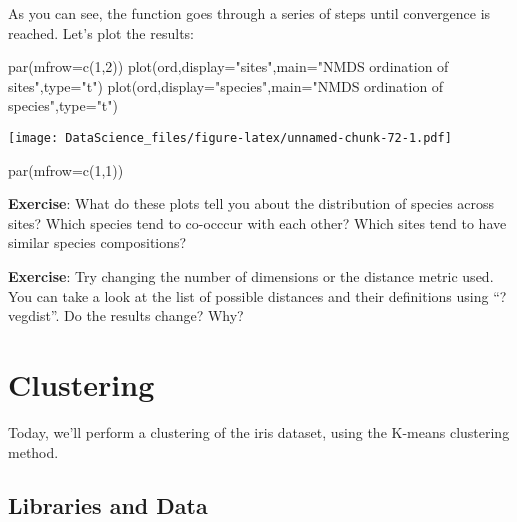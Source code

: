 \documentclass[
]{book}
\newenvironment{Shaded}{\begin{snugshade}}{\end{snugshade}}
\newcommand{\AttributeTok}[1]{\textcolor[rgb]{0.77,0.63,0.00}{#1}}
\newcommand{\DecValTok}[1]{\textcolor[rgb]{0.00,0.00,0.81}{#1}}
\newcommand{\FunctionTok}[1]{\textcolor[rgb]{0.00,0.00,0.00}{#1}}
\newcommand{\NormalTok}[1]{#1}
\newcommand{\StringTok}[1]{\textcolor[rgb]{0.31,0.60,0.02}{#1}}
\begin{document}
As you can see, the function goes through a series of steps until convergence is reached. Let's plot the results:

\begin{Shaded}
\begin{Highlighting}[]
\FunctionTok{par}\NormalTok{(}\AttributeTok{mfrow=}\FunctionTok{c}\NormalTok{(}\DecValTok{1}\NormalTok{,}\DecValTok{2}\NormalTok{))}
\FunctionTok{plot}\NormalTok{(ord,}\AttributeTok{display=}\StringTok{"sites"}\NormalTok{,}\AttributeTok{main=}\StringTok{"NMDS ordination of sites"}\NormalTok{,}\AttributeTok{type=}\StringTok{"t"}\NormalTok{)}
\FunctionTok{plot}\NormalTok{(ord,}\AttributeTok{display=}\StringTok{"species"}\NormalTok{,}\AttributeTok{main=}\StringTok{"NMDS ordination of species"}\NormalTok{,}\AttributeTok{type=}\StringTok{"t"}\NormalTok{)}
\end{Highlighting}
\end{Shaded}

\texttt{[image: DataScience\_files/figure-latex/unnamed-chunk-72-1.pdf]}

\begin{Shaded}
\begin{Highlighting}[]
\FunctionTok{par}\NormalTok{(}\AttributeTok{mfrow=}\FunctionTok{c}\NormalTok{(}\DecValTok{1}\NormalTok{,}\DecValTok{1}\NormalTok{))}
\end{Highlighting}
\end{Shaded}

\textbf{Exercise}: What do these plots tell you about the distribution of species across sites? Which species tend to co-occcur with each other? Which sites tend to have similar species compositions?

\textbf{Exercise}: Try changing the number of dimensions or the distance metric used. You can take a look at the list of possible distances and their definitions using ``?vegdist''. Do the results change? Why?

\hypertarget{clustering}{%
\chapter{Clustering}\label{clustering}}

Today, we'll perform a clustering of the iris dataset, using the K-means clustering method.

\hypertarget{libraries-and-data-1}{%
\section{Libraries and Data}\label{libraries-and-data-1}}
\end{document}
